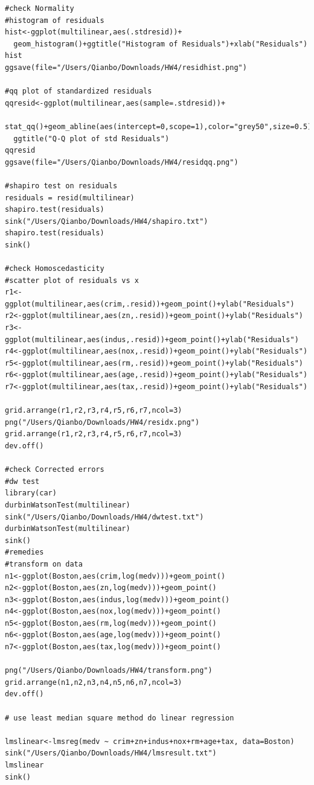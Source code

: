 \documentclass[10pt,letterpaper]{article}
\begin{document}
\begin{lstlisting}
#check Normality
#histogram of residuals
hist<-ggplot(multilinear,aes(.stdresid))+
  geom_histogram()+ggtitle("Histogram of Residuals")+xlab("Residuals")
hist
ggsave(file="/Users/Qianbo/Downloads/HW4/residhist.png")

#qq plot of standardized residuals
qqresid<-ggplot(multilinear,aes(sample=.stdresid))+
  stat_qq()+geom_abline(aes(intercept=0,scope=1),color="grey50",size=0.5)+
  ggtitle("Q-Q plot of std Residuals")
qqresid
ggsave(file="/Users/Qianbo/Downloads/HW4/residqq.png")

#shapiro test on residuals
residuals = resid(multilinear)
shapiro.test(residuals)
sink("/Users/Qianbo/Downloads/HW4/shapiro.txt")
shapiro.test(residuals)
sink()

#check Homoscedasticity
#scatter plot of residuals vs x
r1<-ggplot(multilinear,aes(crim,.resid))+geom_point()+ylab("Residuals")
r2<-ggplot(multilinear,aes(zn,.resid))+geom_point()+ylab("Residuals")
r3<-ggplot(multilinear,aes(indus,.resid))+geom_point()+ylab("Residuals")
r4<-ggplot(multilinear,aes(nox,.resid))+geom_point()+ylab("Residuals")
r5<-ggplot(multilinear,aes(rm,.resid))+geom_point()+ylab("Residuals")
r6<-ggplot(multilinear,aes(age,.resid))+geom_point()+ylab("Residuals")
r7<-ggplot(multilinear,aes(tax,.resid))+geom_point()+ylab("Residuals")

grid.arrange(r1,r2,r3,r4,r5,r6,r7,ncol=3)
png("/Users/Qianbo/Downloads/HW4/residx.png")
grid.arrange(r1,r2,r3,r4,r5,r6,r7,ncol=3)
dev.off()

#check Corrected errors
#dw test
library(car)
durbinWatsonTest(multilinear)
sink("/Users/Qianbo/Downloads/HW4/dwtest.txt")
durbinWatsonTest(multilinear)
sink()
#remedies 
#transform on data 
n1<-ggplot(Boston,aes(crim,log(medv)))+geom_point()
n2<-ggplot(Boston,aes(zn,log(medv)))+geom_point()
n3<-ggplot(Boston,aes(indus,log(medv)))+geom_point()
n4<-ggplot(Boston,aes(nox,log(medv)))+geom_point()
n5<-ggplot(Boston,aes(rm,log(medv)))+geom_point()
n6<-ggplot(Boston,aes(age,log(medv)))+geom_point()
n7<-ggplot(Boston,aes(tax,log(medv)))+geom_point()

png("/Users/Qianbo/Downloads/HW4/transform.png")
grid.arrange(n1,n2,n3,n4,n5,n6,n7,ncol=3)
dev.off()

# use least median square method do linear regression

lmslinear<-lmsreg(medv ~ crim+zn+indus+nox+rm+age+tax, data=Boston)
sink("/Users/Qianbo/Downloads/HW4/lmsresult.txt")
lmslinear
sink()


\end{lstlisting}
\end{document}
